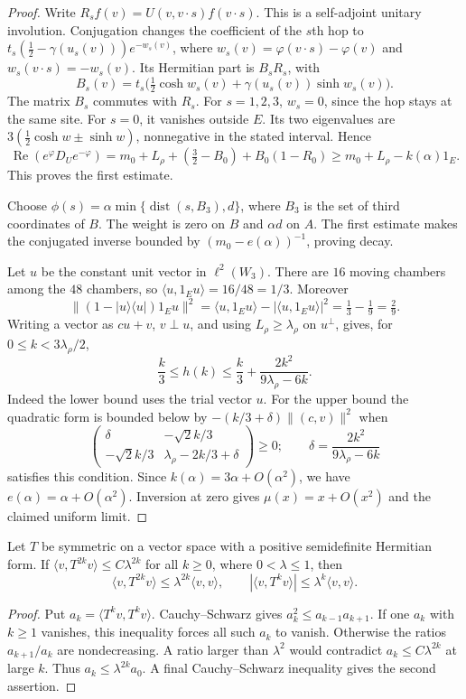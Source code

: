 \documentclass[11pt,letterpaper,reqno]{amsart}
\makeatletter
\theoremstyle{definition}
\newcommand{\ms@minorstart}{%
  \pushQED{\qed}\renewcommand{\qedsymbol}{$\blacksquare$}}
\newenvironment{lemma}[1][]{\ms@minorstart\ms@lemma[#1]}
  {\popQED\endms@lemma}
\theoremstyle{remark}
\makeatother
\begin{document}
\begin{proof}
Write $R_sf(v)=U(v,v\cdot s)f(v\cdot s)$. This is a
self-adjoint unitary involution. Conjugation changes
the coefficient of the $s$th hop to
$t_s(\tfrac12-\gamma(u_s(v)))e^{-w_s(v)}$, where
$w_s(v)=\varphi(v\cdot s)-\varphi(v)$ and
$w_s(v\cdot s)=-w_s(v)$. Its Hermitian part is
$B_sR_s$, with
\[
 B_s(v)=t_s\bigl(\tfrac12\cosh w_s(v)
                         +\gamma(u_s(v))\sinh w_s(v)\bigr).
\]
The matrix $B_s$ commutes with $R_s$. For $s=1,2,3$,
$w_s=0$, since the hop stays at the same site.
For $s=0$, it vanishes outside $E$. Its two eigenvalues
are $3(\frac12\cosh w\pm\sinh w)$, nonnegative in
the stated interval. Hence
\[
 \operatorname{Re}(e^\varphi D_Ue^{-\varphi})
 =m_0+L_\rho+(\tfrac32-B_0)+B_0(1-R_0)
 \ge m_0+L_\rho-k(\alpha)1_E.
\]
This proves the first estimate.

Choose $\phi(s)=\alpha\min\{\operatorname{dist}(s,B_3),d\}$,
where $B_3$ is the set of third coordinates of $B$.
The weight is zero on $B$ and $\alpha d$ on $A$.
The first estimate makes the conjugated inverse
bounded by $(m_0-e(\alpha))^{-1}$, proving decay.

Let $u$ be the constant unit vector in $\ell^2(W_3)$.
There are $16$ moving chambers among the $48$ chambers,
so $\langle u,1_Eu\rangle=16/48=1/3$. Moreover
\[
 \|(1-|u\rangle\langle u|)1_Eu\|^2
       =\langle u,1_Eu\rangle-|\langle u,1_Eu\rangle|^2
       =\tfrac13-\tfrac19=\tfrac29.
\]
Writing a vector as $cu+v$, $v\perp u$, and using
$L_\rho\ge\lambda_\rho$ on $u^\perp$, gives, for
$0\le k<3\lambda_\rho/2$,
\[
 \frac{k}{3}\le h(k)\le
        \frac{k}{3}+\frac{2k^2}{9\lambda_\rho-6k}.
\]
Indeed the lower bound uses the trial vector $u$.
For the upper bound the quadratic form is bounded
below by $-(k/3+\delta)\|(c,v)\|^2$ when
\[
 \begin{pmatrix}
 \delta&-\sqrt2k/3\\
 -\sqrt2k/3&\lambda_\rho-2k/3+\delta
 \end{pmatrix}\ge0;
 \qquad\delta=\frac{2k^2}{9\lambda_\rho-6k}
\]
satisfies this condition. Since $k(\alpha)=3\alpha+O(\alpha^2)$,
we have $e(\alpha)=\alpha+O(\alpha^2)$.
Inversion at zero gives $\mu(x)=x+O(x^2)$ and the
claimed uniform limit.
\end{proof}

\begin{lemma}[Reflection positivity fixes the prefactor]
\label{C-400-17}
Let $T$ be symmetric on a vector space with a positive
semidefinite Hermitian form. If
$\langle v,T^{2k}v\rangle\le C\lambda^{2k}$ for all
$k\ge0$, where $0<\lambda\le1$, then
\[
 \langle v,T^{2k}v\rangle\le\lambda^{2k}\langle v,v\rangle,
 \qquad |\langle v,T^kv\rangle|
                   \le\lambda^k\langle v,v\rangle.
\]
\end{lemma}
\begin{proof}
Put $a_k=\langle T^kv,T^kv\rangle$. Cauchy--Schwarz
gives $a_k^2\le a_{k-1}a_{k+1}$. If one $a_k$ with
$k\ge1$ vanishes, this inequality forces all such
$a_k$ to vanish. Otherwise the ratios $a_{k+1}/a_k$
are nondecreasing. A ratio larger than $\lambda^2$
would contradict $a_k\le C\lambda^{2k}$ at large
$k$. Thus $a_k\le\lambda^{2k}a_0$. A final
Cauchy--Schwarz inequality gives the second assertion.
\end{proof}
\end{document}
